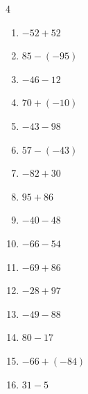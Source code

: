 \begin{multicols}{4}
\begin{enumerate}
        \phantom{$=-87$}

  \item $-52+52$

        \phantom{$=0$}

  \item $85-(-95)$

        \phantom{$=180$}

  \item $-46-12$

        \phantom{$=-58$}

  \item $70+(-10)$

        \phantom{$=60$}

\columnbreak %

  \item $-43-98$

        \phantom{$=-141$}

  \item $57-(-43)$

        \phantom{$=100$}

  \item $-82+30$

        \phantom{$=-52$}

  \item $95+86$

        \phantom{$=181$}

  \item $-40-48$

        \phantom{$=-88$}

  \item $-66-54$

        \phantom{$=-120$}

  \item $-69+86$

        \phantom{$=17$}

  \item $-28+97$

        \phantom{$=69$}

  \item $-49-88$

        \phantom{$=-137$}

  \item $80-17$

        \phantom{$=63$}

  \item $-66+(-84)$

        \phantom{$=-150$}

  \item $31-5$


\end{enumerate}
\end{multicols}
